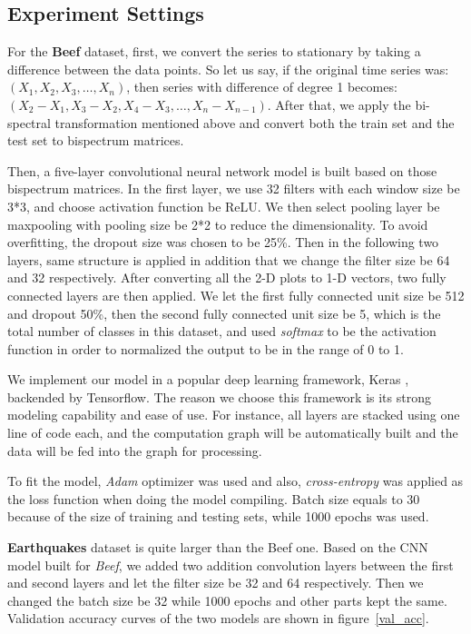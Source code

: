 \documentclass[letterpaper,12pt]{article}
\begin{document}
\subsection{Experiment Settings}

For the \textbf{Beef} dataset, first, we convert the series to stationary by taking a difference between the data points. So let us say, if the original time series was: $(X_1, X_2, X_3,\ldots, X_n)$, then series with difference of degree 1 becomes: $(X_2 - X_1, X_3 - X_2, X_4 - X_3, \ldots, X_n - X_{n-1})$. After that, we apply the bi-spectral transformation mentioned above and convert both the train set and the test set to bispectrum matrices.

Then, a five-layer convolutional neural network model is built based on those bispectrum matrices. In the first layer, we use 32 filters with each window size be 3*3, and choose activation function be ReLU. We then select pooling layer be maxpooling with pooling size be 2*2 to reduce the dimensionality. To avoid overfitting, the dropout size was chosen to be 25\%. Then in the following two layers, same structure is applied in addition that we change the filter size be 64 and 32 respectively. After converting all the 2-D plots to 1-D vectors, two fully connected layers are then applied. We let the first fully connected unit size be 512 and dropout 50\%, then the second fully connected unit size be 5, which is the total number of classes in this dataset, and used \textit{softmax} to be the activation function in order to normalized the output to be in the range of 0 to 1.

We implement our model in a popular deep learning framework, Keras \cite{chollet2015keras}, backended by Tensorflow. The reason we choose this framework is its strong modeling capability and ease of use. For instance, all layers are stacked using one line of code each, and the computation graph will be automatically built and the data will be fed into the graph for processing.

To fit the model, \textit{Adam} optimizer was used and also, \textit{cross-entropy} was applied as the loss function when doing the model compiling. Batch size equals to 30 because of the size of training and testing sets, while 1000 epochs was used. 

\textbf{Earthquakes} dataset is quite larger than the Beef one. Based on the CNN model built for \textit{Beef}, we added two addition convolution layers between the first and second layers and let the filter size be 32 and 64 respectively. Then we changed the batch size be 32 while 1000 epochs and other parts kept the same. Validation accuracy curves of the two models are shown in figure~\ref{val_acc}.
\end{document}
